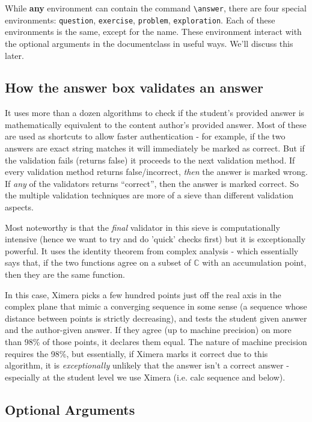 \documentclass{ximera}
\begin{document}
While \textbf{any} environment can contain the command \verb|\answer|,
there are four special environments: \verb|question|, \verb|exercise|,
\verb|problem|, \verb|exploration|. Each of these environments is the
same, except for the name. These environment interact with the
optional arguments in the documentclass in useful ways. We'll discuss
this later.

\subsection*{How the answer box validates an answer}

It uses more than a dozen algorithms to check if the student's provided answer
is mathematically equivalent to the content author's provided answer. Most of
these are used as shortcuts to allow faster authentication - for example, if
the two answers are exact string matches it will immediately be marked as
correct. But if the validation fails (returns false) it proceeds to the next
validation method. If every validation method returns false/incorrect,
\textit{then} the answer is marked wrong. If \textit{any} of the validators
returns ``correct'', then the answer is marked correct. So the multiple
validation techniques are more of a sieve than different validation aspects.

Most noteworthy is that the \textit{final} validator in this sieve is
computationally intensive (hence we want to try and do 'quick' checks first)
but it is exceptionally powerful. It uses the identity theorem from complex
analysis - which essentially says that, if the two functions agree on a subset
of $\mathbb{C}$ with an accumulation point, then they are the same function.

In this case, Ximera picks a few hundred points just off the real axis in the
complex plane that mimic a converging sequence in some sense (a sequence whose
distance between points is strictly decreasing), and tests the student given
answer and the author-given answer. If they agree (up to machine precision) on
more than 98\% of those points, it declares them equal. The nature of machine
precision requires the 98\%, but essentially, if Ximera marks it correct due to
this algorithm, it is \textit{exceptionally} unlikely that the answer isn't a
correct answer - especially at the student level we use Ximera (i.e. calc
sequence and below).

\subsection*{Optional Arguments}
\end{document}
